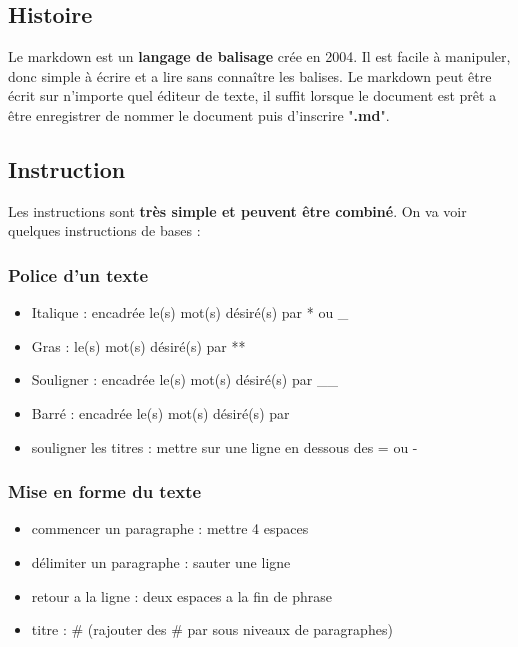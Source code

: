 \subsection{Histoire}

Le markdown est un \textbf{langage de balisage} crée en 2004. Il est facile à manipuler, donc simple à écrire et a lire sans connaître les balises.
Le markdown peut être écrit sur n'importe quel éditeur de texte, il suffit lorsque le document est prêt a être enregistrer de nommer le document puis d'inscrire "\textbf{.md}".


\subsection{Instruction}

Les instructions sont \textbf{très simple et peuvent être combiné}. 
On va voir quelques instructions de bases : 

\subsubsection{Police d'un texte}
\begin{itemize}
	\item Italique : encadrée le(s) mot(s) désiré(s) par * ou _
	\item Gras :  le(s) mot(s) désiré(s) par **
	\item Souligner : encadrée le(s) mot(s) désiré(s) par __
	\item Barré : encadrée le(s) mot(s) désiré(s) par ~~
	\item souligner les titres : mettre sur une ligne en dessous des = ou -
\end{itemize}


\subsubsection{Mise en forme du texte}
\begin{itemize}
	\item commencer un paragraphe : mettre 4 espaces
	\item délimiter un paragraphe : sauter une ligne
	\item retour a la ligne : deux espaces a la fin de phrase
	\item titre : # (rajouter des # par sous niveaux de paragraphes)
\end{itemize}



